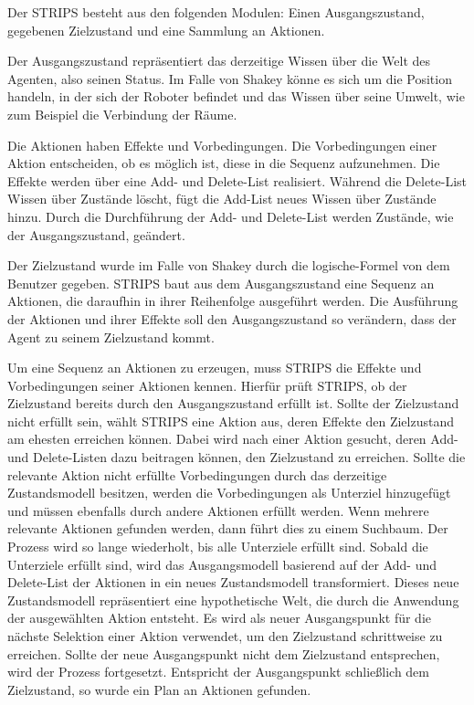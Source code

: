 Der STRIPS besteht aus den folgenden Modulen: Einen Ausgangszustand, gegebenen Zielzustand und eine Sammlung an Aktionen.

Der Ausgangszustand repr\"{a}sentiert das derzeitige Wissen \"{u}ber die Welt des Agenten, also seinen Status. Im Falle von Shakey k\"{o}nne es sich um die Position handeln, in der sich der Roboter befindet und das Wissen \"{u}ber seine Umwelt, wie zum Beispiel die Verbindung der R\"{a}ume.

Die Aktionen haben Effekte und Vorbedingungen. Die Vorbedingungen einer Aktion entscheiden, ob es m\"{o}glich ist, diese in die Sequenz aufzunehmen. Die Effekte werden \"{u}ber eine Add- und Delete-List realisiert. W\"{a}hrend die Delete-List Wissen \"{u}ber Zust\"{a}nde l\"{o}scht, f\"{u}gt die Add-List neues Wissen \"{u}ber Zust\"{a}nde hinzu. Durch die Durchf\"{u}hrung der Add- und Delete-List werden Zust\"{a}nde, wie der Ausgangszustand, ge\"{a}ndert.

Der Zielzustand wurde im Falle von Shakey durch die logische-Formel von dem Benutzer gegeben. STRIPS baut aus dem Ausgangszustand eine Sequenz an Aktionen, die daraufhin in ihrer Reihenfolge ausgef\"{u}hrt werden. Die Ausf\"{u}hrung der Aktionen und ihrer Effekte soll den Ausgangszustand so ver\"{a}ndern, dass der Agent zu seinem Zielzustand kommt.

Um eine Sequenz an Aktionen zu erzeugen, muss STRIPS die Effekte und Vorbedingungen seiner Aktionen kennen. Hierf\"{u}r pr\"{u}ft STRIPS, ob der Zielzustand bereits durch den Ausgangszustand erf\"{u}llt ist. Sollte der Zielzustand nicht erf\"{u}llt sein, w\"{a}hlt STRIPS eine Aktion aus, deren Effekte den Zielzustand am ehesten erreichen k\"{o}nnen. Dabei wird nach einer Aktion gesucht, deren Add- und Delete-Listen dazu beitragen k\"{o}nnen, den Zielzustand zu erreichen. Sollte die relevante Aktion nicht erf\"{u}llte Vorbedingungen durch das derzeitige Zustandsmodell besitzen, werden die Vorbedingungen als Unterziel hinzugef\"{u}gt und m\"{u}ssen ebenfalls durch andere Aktionen erf\"{u}llt werden. Wenn mehrere relevante Aktionen gefunden werden, dann f\"{u}hrt dies zu einem Suchbaum. Der Prozess wird so lange wiederholt, bis alle Unterziele erf\"{u}llt sind. Sobald die Unterziele erf\"{u}llt sind, wird das Ausgangsmodell basierend auf der Add- und Delete-List der Aktionen in ein neues Zustandsmodell transformiert. Dieses neue Zustandsmodell repr\"{a}sentiert eine hypothetische Welt, die durch die Anwendung der ausgew\"{a}hlten Aktion entsteht. Es wird als neuer Ausgangspunkt f\"{u}r die n\"{a}chste Selektion einer Aktion verwendet, um den Zielzustand schrittweise zu erreichen. Sollte der neue Ausgangspunkt nicht dem Zielzustand entsprechen, wird der Prozess fortgesetzt. Entspricht der Ausgangspunkt schlie\ss{}lich dem Zielzustand, so wurde ein Plan an Aktionen gefunden. 
